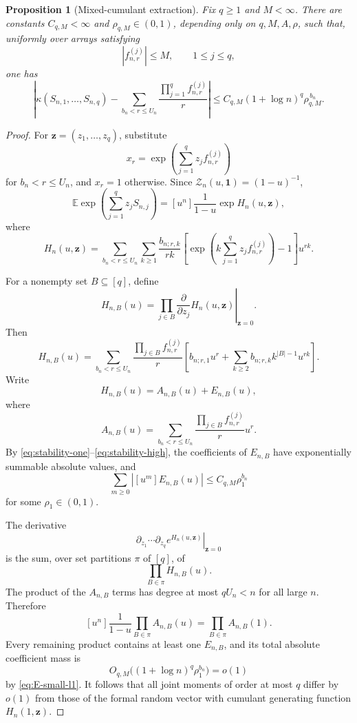 \documentclass[11pt]{article}
\newtheorem{proposition}[theorem]{Proposition}
\theoremstyle{definition}
\theoremstyle{remark}
\newcommand{\Ee}{\mathbb E}
\newcommand{\cZ}{\mathcal Z}
\begin{document}
\begin{proposition}[Mixed-cumulant extraction]\label{prop:mixed-cumulant}
Fix $q\ge1$ and $M<\infty$.  There are constants
$C_{q,M}<\infty$ and $\rho_{q,M}\in(0,1)$, depending only on
$q,M,A,\rho$, such that, uniformly over arrays satisfying
\[
 |f_{n,r}^{(j)}|\le M,
 \qquad
 1\le j\le q,
\]
one has
\begin{equation}\label{eq:mixed-cumulant}
 \left|
 \kappa(S_{n,1},\ldots,S_{n,q})
 -
 \sum_{b_n<r\le U_n}
 \frac{\prod_{j=1}^q f_{n,r}^{(j)}}{r}
 \right|
 \le
 C_{q,M}(1+\log n)^q\rho_{q,M}^{\,b_n}.
\end{equation}
\end{proposition}

\begin{proof}
For $\mathbf z=(z_1,\ldots,z_q)$, substitute
\[
 x_r=\exp\left(\sum_{j=1}^qz_jf_{n,r}^{(j)}\right)
\]
for $b_n<r\le U_n$, and $x_r=1$ otherwise.  Since
$\cZ_n(u,\mathbf1)=(1-u)^{-1}$,
\[
 \Ee\exp\left(\sum_{j=1}^qz_jS_{n,j}\right)
 =
 [u^n]\frac1{1-u}\exp H_n(u,\mathbf z),
\]
where
\[
 H_n(u,\mathbf z)
 =
 \sum_{b_n<r\le U_n}\sum_{k\ge1}
 \frac{b_{n;r,k}}{rk}
 \left[
 \exp\left(k\sum_{j=1}^qz_jf_{n,r}^{(j)}\right)-1
 \right]u^{rk}.
\]

For a nonempty set $B\subseteq[q]$, define
\[
 H_{n,B}(u)
 =
 \left.
 \prod_{j\in B}\frac{\partial}{\partial z_j}
 H_n(u,\mathbf z)
 \right|_{\mathbf z=0}.
\]
Then
\[
 H_{n,B}(u)
 =
 \sum_{b_n<r\le U_n}
 \frac{\prod_{j\in B}f_{n,r}^{(j)}}r
 \left[
 b_{n;r,1}u^r+
 \sum_{k\ge2}b_{n;r,k}k^{|B|-1}u^{rk}
 \right].
\]
Write
\[
 H_{n,B}(u)=A_{n,B}(u)+E_{n,B}(u),
\]
where
\[
 A_{n,B}(u)
 =
 \sum_{b_n<r\le U_n}
 \frac{\prod_{j\in B}f_{n,r}^{(j)}}r u^r.
\]
By \eqref{eq:stability-one}--\eqref{eq:stability-high}, the coefficients
of $E_{n,B}$ have exponentially summable absolute values, and
\begin{equation}\label{eq:E-small-l1}
 \sum_{m\ge0}|[u^m]E_{n,B}(u)|
 \le C_{q,M}\rho_1^{b_n}
\end{equation}
for some $\rho_1\in(0,1)$.

The derivative
\[
 \left.
 \partial_{z_1}\cdots\partial_{z_q}
 e^{H_n(u,\mathbf z)}
 \right|_{\mathbf z=0}
\]
is the sum, over set partitions $\pi$ of $[q]$, of
\[
 \prod_{B\in\pi}H_{n,B}(u).
\]
The product of the $A_{n,B}$ terms has degree at most $qU_n<n$ for all
large $n$.  Therefore
\[
 [u^n]\frac1{1-u}\prod_{B\in\pi}A_{n,B}(u)
 =
 \prod_{B\in\pi}A_{n,B}(1).
\]
Every remaining product contains at least one $E_{n,B}$, and its total
absolute coefficient mass is
\[
 O_{q,M}\bigl((1+\log n)^q\rho_1^{b_n}\bigr)=o(1)
\]
by \eqref{eq:E-small-l1}.  It follows that all joint moments of order at
most $q$ differ by $o(1)$ from those of the formal random vector with
cumulant generating function $H_n(1,\mathbf z)$.


\end{proof}
\end{document}
